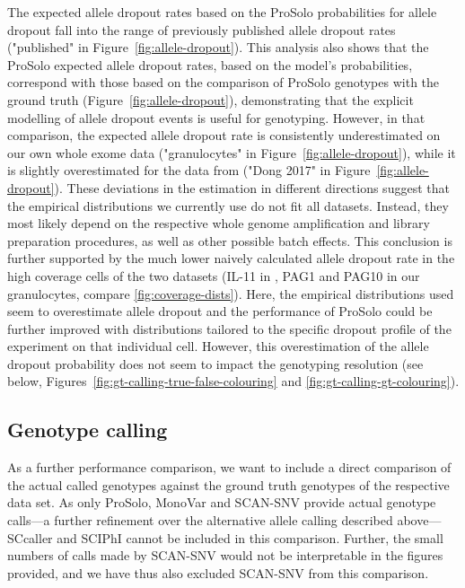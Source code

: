 \documentclass[authoryear,preprint,11pt]{scrartcl}
\begin{document}
The expected allele dropout rates based on the ProSolo probabilities for allele dropout fall into the range of previously published allele dropout rates \citep{wang_clonal_2014,hou_single-cell_2012,xu_single-cell_2012,ling_evaluation_2009,spits_whole-genome_2006,renwick_proof_2006,lodato_somatic_2015} ("published" in Figure~\ref{fig:allele-dropout}).
This analysis also shows that the ProSolo expected allele dropout rates, based on the model's probabilities, correspond with those based on the comparison of ProSolo genotypes with the ground truth (Figure~\ref{fig:allele-dropout}), demonstrating that the explicit modelling of allele dropout events is useful for genotyping.
However, in that comparison, the expected allele dropout rate is consistently underestimated on our own whole exome data ("granulocytes" in Figure~\ref{fig:allele-dropout}), while it is slightly overestimated for the data from \cite{dong_accurate_2017} ("Dong 2017" in Figure~\ref{fig:allele-dropout}).
These deviations in the estimation in different directions suggest that the empirical distributions we currently use do not fit all datasets.
Instead, they most likely depend on the respective whole genome amplification and library preparation procedures, as well as other possible batch effects.
This conclusion is further supported by the much lower naively calculated allele dropout rate in the high coverage cells of the two datasets (IL-11 in \cite{dong_accurate_2017}, PAG1 and PAG10 in our granulocytes, compare \ref{fig:coverage-dists}).
Here, the empirical distributions used seem to overestimate allele dropout and the performance of ProSolo could be further improved with distributions tailored to the specific dropout profile of the experiment on that individual cell.
However, this overestimation of the allele dropout probability does not seem to impact the genotyping resolution (see below, Figures~\ref{fig:gt-calling-true-false-colouring} and \ref{fig:gt-calling-gt-colouring}).


\subsection{Genotype calling} \label{sec:suppl-gt-calling}

As a further performance comparison, we want to include a direct comparison of the actual called genotypes against the ground truth genotypes of the respective data set.
As only ProSolo, MonoVar and SCAN-SNV provide actual genotype calls---a further refinement over the alternative allele calling described above---SCcaller and SCIPhI cannot be included in this comparison.
Further, the small numbers of calls made by SCAN-SNV would not be interpretable in the figures provided, and we have thus also excluded SCAN-SNV from this comparison.
\end{document}
